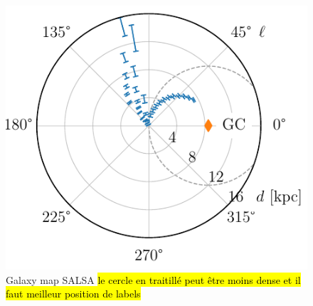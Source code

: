 \begin{figure}[htbp]
\begin{minipage}[t]{0.5\textwidth}
        \includegraphics[scale=1]{figures/SALSA_galaxy_map.pdf}
        \caption{Galaxy map SALSA \hl{le cercle en traitillé peut être moins dense et il faut meilleur position de labels}}
        \label{fig:SALSA_galaxy_map}
    \end{minipage}
\end{figure}